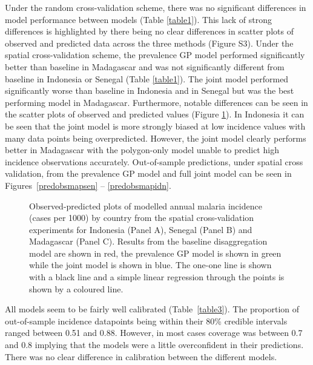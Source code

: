 \documentclass{statsoc}
\begin{document}
Under the random cross-validation scheme, there was no significant differences in model performance between models (Table \ref{table1}).
This lack of strong differences is highlighted by there being no clear differences in scatter plots of observed and predicted data across the three methods (Figure S3).
Under the spatial cross-validation scheme, the prevalence GP model performed significantly better than baseline in Madagascar and was not significantly different from baseline in Indonesia or Senegal (Table \ref{table1}).
The joint model performed significantly worse than baseline in Indonesia and in Senegal but was the best performing model in Madagascar.
Furthermore, notable differences can be seen in the scatter plots of observed and predicted values (Figure \ref{spatial2predobspolyfacet}).
In Indonesia it can be seen that the joint model is more strongly biased at low incidence values with many data points being overpredicted.
However, the joint model clearly performs better in Madagascar with the polygon-only model unable to predict high incidence observations accurately.
Out-of-sample predictions, under spatial cross validation, from the prevalence GP model and full joint model can be seen in Figures~\ref{predobsmapsen} -- \ref{predobsmapidn}.


\begin{figure}
\caption{\label{spatial2predobspolyfacet} 
Observed-predicted plots of modelled annual malaria incidence (cases per 1000) by country from the spatial cross-validation experiments for Indonesia (Panel A), Senegal (Panel B) and Madagascar (Panel C). 
Results from the baseline disaggregation model are shown in red, the prevalence GP model is shown in green while the joint model is shown in blue.
The one-one line is shown with a black line and a simple linear regression through the points is shown by a coloured line.
}

\end{figure}



All models seem to be fairly well calibrated (Table~\ref{table3}).
The proportion of out-of-sample incidence datapoints being within their 80\% credible intervals ranged between 0.51 and 0.88.
However, in most cases coverage was between 0.7 and 0.8 implying that the models were a little overconfident in their predictions.
There was no clear difference in calibration between the different models.
\end{document}
